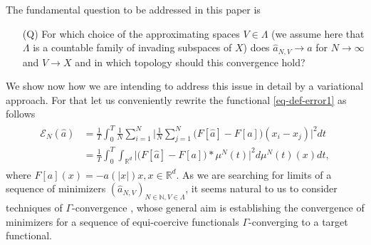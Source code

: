 \documentclass[A4paper,11pt]{article}
\theoremstyle{definition}
\newcommand{\R}{\mathbb{R}}
\begin{document}
The fundamental question to be addressed in this paper is
\begin{itemize}
\item[(Q)] For which choice of the approximating spaces $V \in \Lambda$ (we assume here that $\Lambda$ is a countable family of invading subspaces of $X$) does $\widehat a_{N,V} \to a$ for $N \to \infty$ and $V \to X$ and 
in which topology should this convergence hold?
\end{itemize}
We show now how  we are intending to address this issue in detail by a variational approach.
For that let us conveniently rewrite the functional \eqref{eq-def-error1} as follows
\begin{align}\label{pirlo}
	\begin{split}
	\mathcal E_N(\widehat a) & = \frac{1}{T}\int_0^T\frac{1}{N}\sum_{i=1}^N\biggl|\frac{1}{N}\sum_{j=1}^N
			\bigl(F[\widehat a]-F[a]\bigr)(x_i-x_j)\biggr|^2 dt\\
			& = \frac{1}{T}\int_0^T \int_{\R^d} \biggl|\bigl(F[\widehat a]-F[a]\bigr)\ast\mu^N(t)\biggr|^2d\mu^N(t)(x)dt,
	\end{split}
\end{align}
where $F[a](x) =-a(| x |)x, x \in \mathbb R^{d}$.  As we are searching for limits of a sequence of minimizers $(\widehat a_{N,V})_{N \in \mathbb N, V \in \Lambda}$, it seems natural to us to consider  techniques of $\Gamma$-convergence \cite{MR1201152}, whose general aim is establishing the convergence of minimizers for a sequence of equi-coercive functionals $\Gamma$-converging to a target functional.
\end{document}

